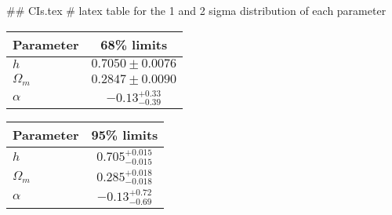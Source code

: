 ## CIs.tex
# latex table for the 1 and 2 sigma distribution of each parameter

\begin{tabular} { l  c}
 Parameter &  68\% limits\\
\hline
{\boldmath$h              $} & $0.7050\pm 0.0076          $\\
{\boldmath$\Omega_m       $} & $0.2847\pm 0.0090          $\\
{\boldmath$\alpha         $} & $-0.13^{+0.33}_{-0.39}     $\\
\hline
\end{tabular}

\begin{tabular} { l  c}
 Parameter &  95\% limits\\
\hline
{\boldmath$h              $} & $0.705^{+0.015}_{-0.015}   $\\
{\boldmath$\Omega_m       $} & $0.285^{+0.018}_{-0.018}   $\\
{\boldmath$\alpha         $} & $-0.13^{+0.72}_{-0.69}     $\\
\hline
\end{tabular}
